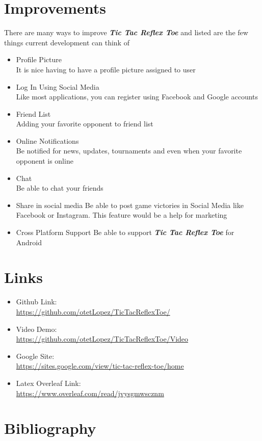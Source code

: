 \documentclass{article}
\begin{document}
\section{Improvements}
There are many ways to improve \textbf{\emph{Tic Tac Reflex Toe}} and listed are the few things current development can think of
\begin{itemize}
    \item Profile Picture\\
    It is nice having to have a profile picture assigned to user
    \item Log In Using Social Media\\
    Like most applications, you can register using Facebook and Google accounts
    \item Friend List\\
    Adding your favorite opponent to friend list
    \item Online Notifications\\
    Be notified for news, updates, tournaments and even when your favorite opponent is online
    \item Chat\\
    Be able to chat your friends
    \item Share in social media
    Be able to post game victories in Social Media like Facebook or Instagram.  This feature would be a help for marketing
    \item Cross Platform Support
    Be able to support \textbf{\emph{Tic Tac Reflex Toe}} for Android
\end{itemize}
\section{Links}
\begin{itemize}
    \item Github Link:\\ \url{https://github.com/otetLopez/TicTacReflexToe/}
    \item Video Demo:\\
    \url{https://github.com/otetLopez/TicTacReflexToe/Video}
    \item Google Site:\\
    \url{https://sites.google.com/view/tic-tac-reflex-toe/home}
    \item Latex Overleaf Link:\\
    \url{https://www.overleaf.com/read/jvysgmwscznm}
\end{itemize}
\newpage

\section{Bibliography}
\end{document}
